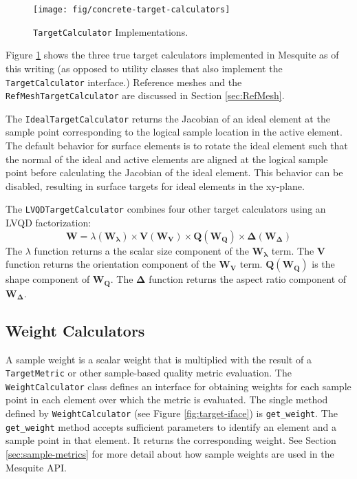 \documentclass{article}
\begin{document}
\begin{figure}[htb]
\begin{center}
\texttt{[image: fig/concrete-target-calculators]}
\caption{\texttt{TargetCalculator} Implementations.\label{fig:target-concrete}}
\end{center}
\end{figure}

Figure \ref{fig:target-concrete} shows the three true target calculators implemented in Mesquite as of this writing (as opposed to utility classes that also implement the \texttt{TargetCalculator} interface.)  Reference meshes and the \texttt{RefMeshTargetCalculator} are discussed in Section \ref{sec:RefMesh}.

The \texttt{IdealTargetCalculator} returns the Jacobian of an ideal element at the sample point corresponding to the logical sample location in the active element.  The default behavior for surface elements is to rotate the ideal element such that the normal of the ideal and active elements are aligned at the logical sample point before calculating the Jacobian of the ideal element.  This behavior can be disabled, resulting in surface targets for ideal elements in the xy-plane.

The \texttt{LVQDTargetCalculator} combines four other target calculators using an LVQD factorization:
\begin{displaymath}
\mathbf{W} = \lambda(\mathbf{W_\lambda}) \times \mathbf{V}(\mathbf{W_V}) \times \mathbf{Q}(\mathbf{W_Q}) \times \mathbf{\Delta}(\mathbf{W_\Delta}) 
\end{displaymath}
The $\lambda$ function returns a the scalar size component of the $\mathbf{W_\lambda}$ term.  The $\mathbf{V}$ function returns the orientation component of the $\mathbf{W_V}$ term.  $\mathbf{Q}(\mathbf{W_Q})$ is the shape component of $\mathbf{W_Q}$.  The $\mathbf{\Delta}$ function returns the aspect ratio component of $\mathbf{W_\Delta}$.  

\subsection{Weight Calculators}

A sample weight is a scalar weight that is multiplied with the result of a \texttt{TargetMetric} or other sample-based quality metric evaluation.  The \texttt{WeightCalculator} class defines an interface for obtaining weights for each sample point in each element over which the metric is evaluated.  The single method defined by \texttt{WeightCalculator} (see Figure \ref{fig:target-iface}) is \texttt{get\_weight}.  The \texttt{get\_weight} method accepts sufficient parameters to identify an element and a sample point in that element.  It returns the corresponding weight.  See Section \ref{sec:sample-metrics} for more detail about how sample weights are used in the Mesquite API.
\end{document}

